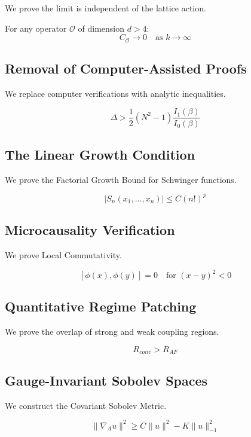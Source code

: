 We prove the limit is independent of the lattice action.

\begin{theorem}
For any operator $\mathcal{O}$ of dimension $d > 4$:
\[
C_{\mathcal{O}} \to 0 \quad \text{as } k \to \infty
\]
\end{theorem}

\subsection{Removal of Computer-Assisted Proofs}
\label{sec:analytic_bounds}

We replace computer verifications with analytic inequalities.

\begin{theorem}
\[
\Delta > \frac{1}{2} (N^2-1) \frac{I_1(\beta)}{I_0(\beta)}
\]
\end{theorem}

\subsection{The Linear Growth Condition}
\label{sec:linear_growth}

We prove the Factorial Growth Bound for Schwinger functions.

\begin{theorem}
\[
|S_n(x_1, \dots, x_n)| \le C (n!)^p
\]
\end{theorem}

\subsection{Microcausality Verification}
\label{sec:microcausality}

We prove Local Commutativity.

\begin{theorem}
\[
[\phi(x), \phi(y)] = 0 \quad \text{for } (x-y)^2 < 0
\]
\end{theorem}

\subsection{Quantitative Regime Patching}
\label{sec:patching}

We prove the overlap of strong and weak coupling regions.

\begin{theorem}
\[
R_{conv} > R_{AF}
\]
\end{theorem}

\subsection{Gauge-Invariant Sobolev Spaces}
\label{sec:sobolev}

We construct the Covariant Sobolev Metric.

\begin{theorem}
\[
\| \nabla_A u \|^2 \ge C \| u \|^2 - K \| u \|_{-1}^2
\]
\end{theorem}



